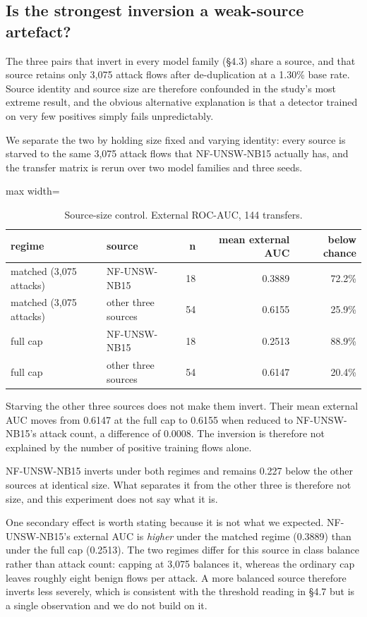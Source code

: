 \documentclass[preprint,12pt]{elsarticle}
\begin{document}
\subsection{Is the strongest inversion a weak-source artefact?}

The three pairs that invert in every model family (\S{}4.3) share a source, and that source retains only 3,075 attack flows after de-duplication at a 1.30\% base rate. Source identity and source size are therefore confounded in the study's most extreme result, and the obvious alternative explanation is that a detector trained on very few positives simply fails unpredictably.

We separate the two by holding size fixed and varying identity: every source is starved to the same 3,075 attack flows that NF-UNSW-NB15 actually has, and the transfer matrix is rerun over two model families and three seeds.

\begin{table}[htbp]\centering\scriptsize
\caption{Source-size control. External ROC-AUC, 144 transfers.}
\begin{adjustbox}{max width=\textwidth}\begin{tabular}{llrrr}
\toprule
regime & source & n & mean external AUC & below chance \\
\midrule
matched (3,075 attacks) & NF-UNSW-NB15 & 18 & 0.3889 & 72.2\% \\
matched (3,075 attacks) & other three sources & 54 & 0.6155 & 25.9\% \\
full cap & NF-UNSW-NB15 & 18 & 0.2513 & 88.9\% \\
full cap & other three sources & 54 & 0.6147 & 20.4\% \\
\bottomrule
\end{tabular}\end{adjustbox}
\end{table}

Starving the other three sources does not make them invert. Their mean external AUC moves from 0.6147 at the full cap to 0.6155 when reduced to NF-UNSW-NB15's attack count, a difference of 0.0008. The inversion is therefore not explained by the number of positive training flows alone.

NF-UNSW-NB15 inverts under both regimes and remains 0.227 below the other sources at identical size. What separates it from the other three is therefore not size, and this experiment does not say what it is.

One secondary effect is worth stating because it is not what we expected. NF-UNSW-NB15's external AUC is \emph{higher} under the matched regime (0.3889) than under the full cap (0.2513). The two regimes differ for this source in class balance rather than attack count: capping at 3,075 balances it, whereas the ordinary cap leaves roughly eight benign flows per attack. A more balanced source therefore inverts less severely, which is consistent with the threshold reading in \S{}4.7 but is a single observation and we do not build on it.
\end{document}
